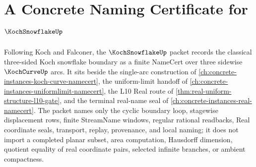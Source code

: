 \chapter{A Concrete Naming Certificate for $\KochSnowflakeUp$}
\label{ch:concrete-instances-koch-snowflake-namecert}

Following Koch and Falconer, the $\KochSnowflakeUp$ packet records the classical three-sided Koch snowflake boundary as a finite NameCert over three sidewise $\KochCurveUp$ arcs. It sits beside the single-arc construction of \autoref{ch:concrete-instances-koch-curve-namecert}, the uniform-limit handoff of \autoref{ch:concrete-instances-uniformlimit-namecert}, the L10 Real route of \autoref{thm:real-uniform-structure-l10-gate}, and the terminal real-name seal of \autoref{ch:concrete-instances-real-namecert}. The packet names only the cyclic boundary loop, stagewise displacement rows, finite StreamName windows, regular rational readbacks, Real coordinate seals, transport, replay, provenance, and local naming; it does not import a completed planar subset, area computation, Hausdorff dimension, quotient equality of real coordinate pairs, selected infinite branches, or ambient compactness.

